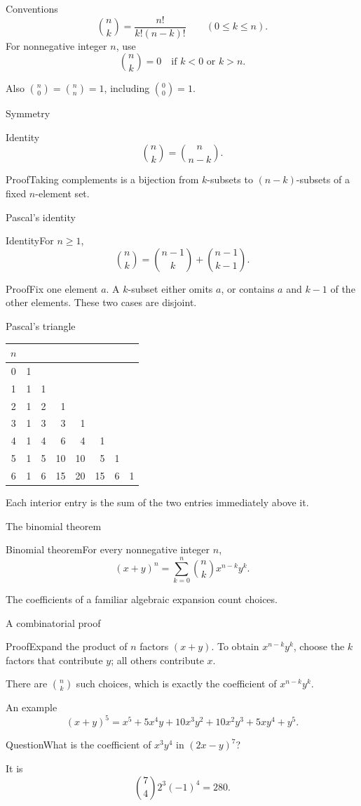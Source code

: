 \documentclass[aspectratio=169,11pt]{beamer}
\newcommand{\Thm}[2]{\begin{block}{#1}#2\end{block}}
\renewcommand{\Proof}[1]{\begin{block}{Proof}\normalsize #1\end{block}}
\newcommand{\Question}[1]{\begin{block}{Question}#1\end{block}}
\newcommand{\gap}{\par\medskip}
\begin{document}
\begin{frame}{Conventions}
\large
\[\binom nk=\frac{n!}{k!(n-k)!}\qquad(0\leq k\leq n).\]
For nonnegative integer $n$, use
\[\binom nk=0\quad\text{if }k<0\text{ or }k>n.\]
\gap Also $\binom n0=\binom nn=1$, including $\binom00=1$.
\end{frame}
\begin{frame}{Symmetry}
\large
\Thm{Identity}{\[\binom nk=\binom n{n-k}.\]}
\Proof{Taking complements is a bijection from $k$-subsets to $(n-k)$-subsets of a fixed $n$-element set.}
\end{frame}
\begin{frame}{Pascal's identity}
\large
\Thm{Identity}{For $n\geq1$,
\[\binom nk=\binom{n-1}k+\binom{n-1}{k-1}.\]}
\Proof{Fix one element $a$. A $k$-subset either omits $a$, or contains $a$ and $k-1$ of the other elements. These two cases are disjoint.}
\end{frame}
\begin{frame}{Pascal's triangle}
\large
\begin{center}\renewcommand{\arraystretch}{1.25}
\begin{tabular}{c|rrrrrrr}
$n$&&&&&&&\\\hline
0&1\\1&1&1\\2&1&2&1\\3&1&3&3&1\\4&1&4&6&4&1\\5&1&5&10&10&5&1\\6&1&6&15&20&15&6&1
\end{tabular}\end{center}
Each interior entry is the sum of the two entries immediately above it.
\end{frame}
\begin{frame}{The binomial theorem}
\large
\Thm{Binomial theorem}{For every nonnegative integer $n$,
\[(x+y)^n=\sum_{k=0}^n\binom nk x^{n-k}y^k.\]}
\gap The coefficients of a familiar algebraic expansion count choices.
\end{frame}
\begin{frame}{A combinatorial proof}
\large
\Proof{Expand the product of $n$ factors $(x+y)$. To obtain $x^{n-k}y^k$, choose the $k$ factors that contribute $y$; all others contribute $x$.\gap There are $\binom nk$ such choices, which is exactly the coefficient of $x^{n-k}y^k$.}
\end{frame}
\begin{frame}{An example}
\large
\[(x+y)^5=x^5+5x^4y+10x^3y^2+10x^2y^3+5xy^4+y^5.\]
\Question{What is the coefficient of $x^3y^4$ in $(2x-y)^7$?}
\gap It is
\[\binom74 2^3(-1)^4=280.\]
\end{frame}
\end{document}
